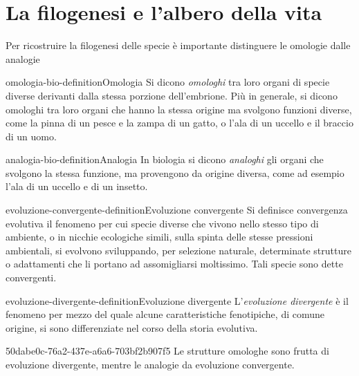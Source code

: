\documentclass[preview]{standalone}
\begin{document}
\genpage

\section{La filogenesi e l'albero della vita}

\begin{plainhtml}
    Per ricostruire la filogenesi delle specie è
    importante distinguere le omologie dalle analogie
\end{plainhtml}

\begin{snippetdefinition}{omologia-bio-definition}{Omologia}
    Si dicono \textit{omologhi} tra loro organi di specie diverse derivanti dalla stessa porzione dell'embrione.
    Più in generale, si dicono omologhi tra loro organi che hanno la stessa origine ma svolgono funzioni diverse, come la pinna di un pesce e la zampa di un gatto, o l'ala di un uccello e il braccio di un uomo.
\end{snippetdefinition}

\begin{snippetdefinition}{analogia-bio-definition}{Analogia}
    In biologia si dicono \textit{analoghi} gli organi che svolgono la stessa funzione, ma provengono da origine diversa, come ad esempio l'ala di un uccello e di un insetto.
\end{snippetdefinition}

\begin{snippetdefinition}{evoluzione-convergente-definition}{Evoluzione convergente}
    Si definisce convergenza evolutiva il fenomeno per cui specie diverse che vivono nello stesso tipo di ambiente, o in nicchie ecologiche simili, sulla spinta delle stesse pressioni ambientali, si evolvono sviluppando, per selezione naturale, determinate strutture o adattamenti che li portano ad assomigliarsi moltissimo. Tali specie sono dette convergenti. 
\end{snippetdefinition}

\begin{snippetdefinition}{evoluzione-divergente-definition}{Evoluzione divergente}
    L'\textit{evoluzione divergente} è il fenomeno per mezzo del quale alcune caratteristiche fenotipiche, di comune origine, si sono differenziate nel corso della storia evolutiva. 
\end{snippetdefinition}

\begin{snippet}{50dabe0c-76a2-437e-a6a6-703bf2b907f5}
    Le strutture omologhe sono frutta di evoluzione divergente, mentre le analogie da
    evoluzione convergente.
\end{snippet}
\end{document}
